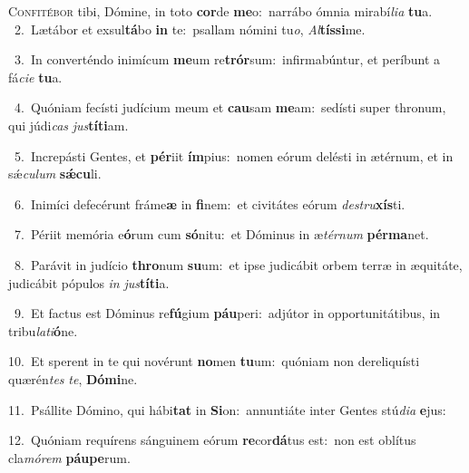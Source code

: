 \lettrine{\initial\textcolor{\initialcolor}{C}}{onfitébor} tibi, Dómine, in toto \textbf{cor}\-de \textbf{me}\-o:~\star narrábo ómnia mirabí\-\textit{li}\-\textit{a} \textbf{tu}\-a.\\
{\numbfont\textcolor{\numbcolor}{~2.}}~Lætábor et exsul\-\textbf{tá}\-bo \textbf{in} te:~\star psallam nómini tu\-\textit{o}\-, \textit{Al}\-\textbf{tís}\textbf{si}me.\par
{\numbfont\textcolor{\numbcolor}{~3.}}~In converténdo inimícum \textbf{me}\-um re\-\textbf{trór}\-sum:~\star infirmabúntur, et períbunt a fá\-\textit{ci}\-\textit{e} \textbf{tu}\-a.\par
{\numbfont\textcolor{\numbcolor}{~4.}}~Quóniam fecísti judícium meum et \textbf{cau}\-sam \textbf{me}\-am:~\star sedísti super thronum, qui júdi\textit{cas} \textit{jus}\-\textbf{tí}\textbf{ti}am.\par
{\numbfont\textcolor{\numbcolor}{~5.}}~Increpásti Gentes, et \textbf{pér}\-iit \textbf{ím}\-pius:~\star nomen eórum delésti in ætérnum, et in sǽ\-\textit{cu}\-\textit{lum} \textbf{sǽ}\-\textbf{cu}li.\par
{\numbfont\textcolor{\numbcolor}{~6.}}~Inimíci defecérunt fráme\textbf{æ} in \textbf{fi}\-nem:~\star et civitátes eórum \textit{de}\-\textit{stru}\textbf{xís}ti.\par
{\numbfont\textcolor{\numbcolor}{~7.}}~Périit memória e\-\textbf{ó}\-rum cum \textbf{só}\-nitu:~\star et Dóminus in æ\-\textit{tér}\-\textit{num} \textbf{pér}\-\textbf{ma}net.\par
{\numbfont\textcolor{\numbcolor}{~8.}}~Parávit in judício \textbf{thro}\-num \textbf{su}\-um:~\star et ipse judicábit orbem terræ in æquitáte, judicábit pópulos \textit{in} \textit{jus}\-\textbf{tí}\textbf{ti}a.\par
{\numbfont\textcolor{\numbcolor}{~9.}}~Et factus est Dóminus re\-\textbf{fú}\-gium \textbf{páu}\-peri:~\star adjútor in opportunitátibus, in tribu\-\textit{la}\-\textit{ti}\textbf{ó}ne.\par
{\numbfont\textcolor{\numbcolor}{10.}}~Et sperent in te qui novérunt \textbf{no}\-men \textbf{tu}\-um:~\star quóniam non dereliquísti quærén\textit{tes} \textit{te}\-, \textbf{Dó}\-\textbf{mi}ne.\par
{\numbfont\textcolor{\numbcolor}{11.}}~Psállite Dómino, qui hábi\textbf{tat} in \textbf{Si}\-on:~\star annuntiáte inter Gentes stú\-\textit{di}\-\textit{a} \textbf{e}\-jus:\par
{\numbfont\textcolor{\numbcolor}{12.}}~Quóniam requírens sánguinem eórum \textbf{re}\-cor\-\textbf{dá}\-tus est:~\star non est oblítus cla\-\textit{mó}\-\textit{rem} \textbf{páu}\-\textbf{pe}rum.\par
